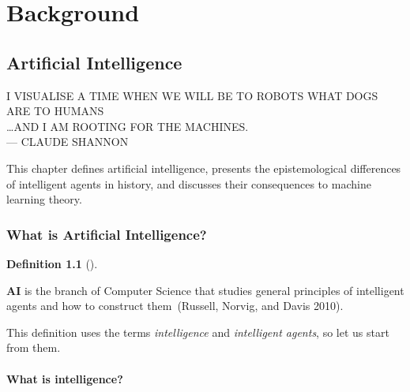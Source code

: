 \documentclass[
  letterpaper,
  12pt,
  british]{tufte-book}
\renewcommand{\textls}[2][5]{%
  \begingroup\addfontfeatures{LetterSpace=#1}#2\endgroup
}
\renewcommand{\allcaps}[1]{\textls[15]{\MakeTextUppercase{#1}}}
\newcommand{\epigraph}[2]{%
  \begin{fullwidth}
  \begin{flushright}
  \sffamily\fontsize{8}{10}\selectfont
  \sffamily\footnotesize
  \begin{doublespace}
  \vspace{-8cm}\noindent\allcaps{#1}\\%
  \noindent\allcaps{#2}\\%
  \end{doublespace}
  \vspace{5.1cm}
  \end{flushright}
  \end{fullwidth}
  \normalfont
}
\renewenvironment{quote}{
  \list{}{\leftmargin=3.5cm\topsep=0pt}
  \item\relax\small\itshape
}
{\endlist}
\theoremstyle{plain}
\theoremstyle{plain}
\theoremstyle{definition}
\newtheorem{definition}{Definition}[chapter]
\theoremstyle{remark}
\begin{document}
\begin{quote}
\end{quote}

\part{Background}

\hypertarget{artificial-intelligence}{%
\chapter{Artificial Intelligence}\label{artificial-intelligence}}

\epigraph{I visualise a time when we will be to robots what dogs are to humans \\
\ldots and I am rooting for the machines.}{--- Claude Shannon}

This chapter defines artificial intelligence, presents the
epistemological differences of intelligent agents in history, and
discusses their consequences to machine learning theory.

\hypertarget{artificial-intelligence}{%
\section{What is Artificial
Intelligence?}\label{artificial-intelligence}}

\leavevmode{}%
\begin{definition}[]\label{def-ai}

\textbf{AI} is the branch of Computer Science that studies general
principles of intelligent agents and how to construct them~(Russell,
Norvig, and Davis
2010).

\end{definition}

This definition uses the terms \emph{intelligence} and \emph{intelligent
agents}, so let us start from them.

\hypertarget{what-is-intelligence}{%
\subsection{What is intelligence?}\label{what-is-intelligence}}
\end{document}
